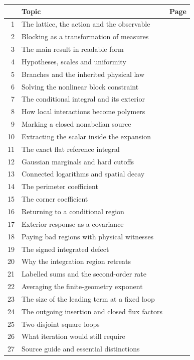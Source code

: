 \documentclass[11pt,a4paper]{article}
\begin{document}
\vspace{5pt}
\begin{tabularx}{\textwidth}{@{}rXr@{}}
    \toprule
    & \textbf{Topic} & \textbf{Page}\\
    \midrule
    1 & The lattice, the action and the observable & \pageref{summary:1}\\
    2 & Blocking as a transformation of measures & \pageref{summary:2}\\
    3 & The main result in readable form & \pageref{summary:3}\\
    4 & Hypotheses, scales and uniformity & \pageref{summary:4}\\
    5 & Branches and the inherited physical law & \pageref{summary:5}\\
    6 & Solving the nonlinear block constraint & \pageref{summary:6}\\
    7 & The conditional integral and its exterior & \pageref{summary:7}\\
    8 & How local interactions become polymers & \pageref{summary:8}\\
    9 & Marking a closed nonabelian source & \pageref{summary:9}\\
    10 & Extracting the scalar inside the expansion & \pageref{summary:10}\\
    11 & The exact flat reference integral & \pageref{summary:11}\\
    12 & Gaussian marginals and hard cutoffs & \pageref{summary:12}\\
    13 & Connected logarithms and spatial decay & \pageref{summary:13}\\
    14 & The perimeter coefficient & \pageref{summary:14}\\
    15 & The corner coefficient & \pageref{summary:15}\\
    16 & Returning to a conditional region & \pageref{summary:16}\\
    17 & Exterior response as a covariance & \pageref{summary:17}\\
    18 & Paying bad regions with physical witnesses & \pageref{summary:18}\\
    19 & The signed integrated defect & \pageref{summary:19}\\
    20 & Why the integration region retreats & \pageref{summary:20}\\
    21 & Labelled sums and the second-order rate & \pageref{summary:21}\\
    22 & Averaging the finite-geometry exponent & \pageref{summary:22}\\
    23 & The size of the leading term at a fixed loop & \pageref{summary:23}\\
    24 & The outgoing insertion and closed flux factors & \pageref{summary:24}\\
    25 & Two disjoint square loops & \pageref{summary:25}\\
    26 & What iteration would still require & \pageref{summary:26}\\
    27 & Source guide and essential distinctions & \pageref{summary:27}\\
    \bottomrule
\end{tabularx}
\end{document}

